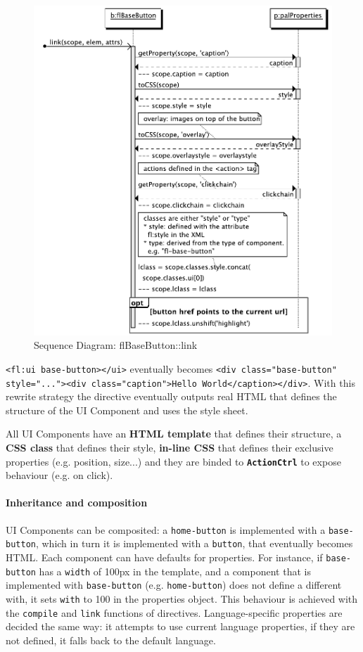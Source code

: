 \begin{figure}[htb]
    \centering
    \includegraphics{figures/design/seqdia/basebutton-link.pdf}
    \caption{Sequence Diagram: flBaseButton::link}
    \label{fig:design-seqdia-basebutton-link}
\end{figure}

\lstinline$<fl:ui base-button></ui>$ eventually becomes \lstinline$<div class="base-button" style="..."><div class="caption">Hello World</caption></div>$. 
With this rewrite strategy the directive eventually outputs real \ac{HTML} that defines the structure of the UI Component and uses the style sheet.

All UI Components have an  \textbf{\ac{HTML} template} that defines their structure, a \textbf{\ac{CSS} class} that defines their style, \textbf{in-line \ac{CSS}} that defines their exclusive properties (e.g. position, size...) and they are binded to \textbf{\texttt{ActionCtrl}} to expose behaviour (e.g. on click).
\FloatBarrier

\paragraph{Inheritance and composition} UI Components can be composited: a \texttt{home-button} is implemented with a \texttt{base-button}, which in turn it is implemented with a \texttt{button}, that eventually becomes \ac{HTML}.
Each component can have defaults for properties.
For instance, if \texttt{base-button} has a \texttt{width} of 100px in the template, and a component that is implemented with \texttt{base-button} (e.g. \texttt{home-button}) does not define a different with, it sets \texttt{with} to 100 in the properties object.
This behaviour is achieved with the \texttt{compile} and \texttt{link} functions of directives.
Language-specific properties are decided the same way: it attempts to use current language properties, if they are not defined, it falls back to the default language.

